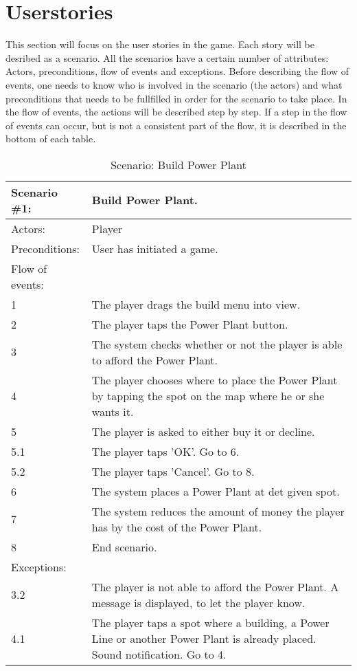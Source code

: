 \section{Userstories}

This section will focus on the user stories in the game. Each story will be desribed as a scenario. All the scenarios have a certain number of attributes: Actors, preconditions, flow of events and exceptions. Before describing the flow of events, one needs to know who is involved in the scenario (the actors) and what preconditions that needs to be fullfilled in order for the scenario to take place. In the flow of events, the actions will be described step by step. If a step in the flow of events can occur, but is not a consistent part of the flow, it is described in the bottom of each table.\\


\begin{table}
	\begin{tabular}{| l | p{10cm} |}
		\hline
		\rowcolor{lightgray}
		{\bf Scenario \#1:} & {\bf Build Power Plant.} \\ \hline
		Actors: & Player \\ \hline
		Preconditions: & User has initiated a game. \\ \hline
		Flow of events: &  \\ \hline
		1 & The player drags the build menu into view. \\ \hline
		2 & The player taps the Power Plant button. \\ \hline
		3 & The system checks whether or not the player is able to afford the Power Plant. \\ \hline
		4 & The player chooses where to place the Power Plant by tapping the spot on the map where he or she wants it. \\ \hline
		5 & The player is asked to either buy it or decline. \\ \hline
		5.1 & The player taps 'OK'. Go to 6. \\ \hline
		5.2 & The player taps 'Cancel'. Go to 8. \\ \hline
		6 & The system places a Power Plant at det given spot. \\ \hline
		7 & The system reduces the amount of money the player has by the cost of the Power Plant. \\ \hline
		8 & End scenario. \\ \hline
		Exceptions: & \\ \hline
		3.2 & The player is not able to afford the Power Plant. A message is displayed, to let the player know. \\ \hline
		4.1 & The player taps a spot where a building, a Power Line or another Power Plant is already placed. Sound notification. Go to 4. \\ \hline
	\end{tabular}
\caption{Scenario: Build Power Plant}
\end{table}

